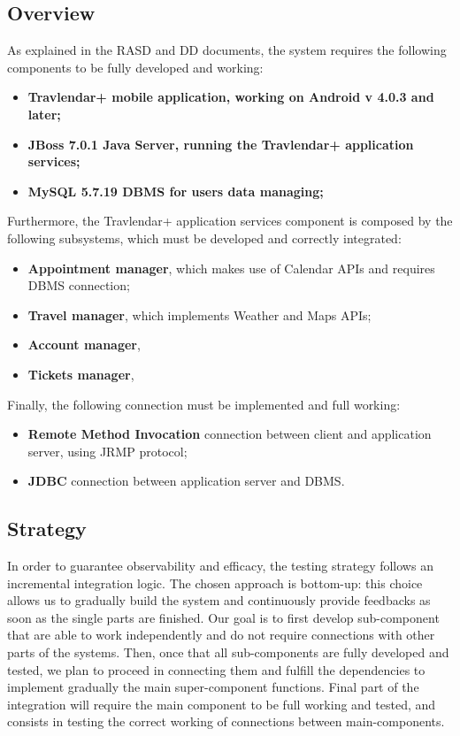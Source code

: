 \subsection{Overview}

As explained in the RASD and DD documents, the system requires the following components to be fully developed and working:
\begin{itemize}
	\item \textbf{Travlendar+ mobile application, working on Android v 4.0.3 and later;}
	\item \textbf{JBoss 7.0.1 Java Server, running the Travlendar+ application services;}
	\item \textbf{MySQL 5.7.19 DBMS for users data managing;}
\end{itemize}
Furthermore, the Travlendar+ application services component is composed by the following subsystems, which must be developed and correctly integrated:
\begin{itemize}
	\item \textbf{Appointment manager}, which makes use of Calendar APIs and requires DBMS connection;
	\item \textbf{Travel manager}, which implements Weather and Maps APIs;
	\item \textbf{Account manager},
	\item \textbf{Tickets manager},
\end{itemize}
Finally, the following connection must be implemented and full working:
\begin{itemize}
	\item \textbf{Remote Method Invocation} connection between client and application server, using JRMP protocol;
	\item \textbf{JDBC} connection between application server and DBMS.
\end{itemize}

\subsection{Strategy}
In order to guarantee observability and efficacy, the testing strategy follows an incremental integration logic. The chosen approach is bottom-up: this choice allows us to gradually build the system and continuously provide feedbacks as soon as the single parts are finished. Our goal is to first develop sub-component that are able to work independently and do not require connections with other parts of the systems. Then, once that all sub-components are fully developed and tested, we plan to proceed in connecting them and fulfill the dependencies to implement gradually the main super-component functions. Final part of the integration will require the main component to be full working and tested, and consists in testing the correct working of connections between main-components. 

